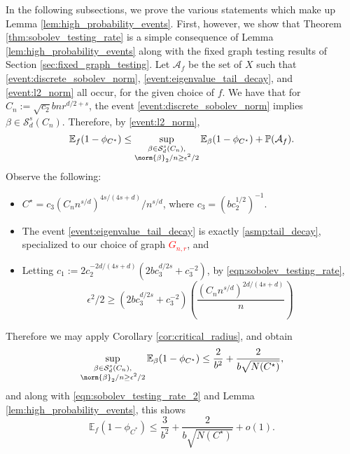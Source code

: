 \documentclass{article}
\newcommand{\1}{\mathbf{1}}
\newcommand{\Pbb}{\mathbb{P}}
\newcommand{\Ebb}{\mathbb{E}}
\theoremstyle{alden}
\theoremstyle{aldenthm}
\theoremstyle{definition}
\theoremstyle{remark}
\begin{document}
In the following subsections, we prove the various statements which make up Lemma \ref{lem:high_probability_events}. First, however, we show that Theorem \ref{thm:sobolev_testing_rate} is a simple consequence of Lemma \ref{lem:high_probability_events} along with the fixed graph testing results of Section \ref{sec:fixed_graph_testing}. Let $\mathcal{A}_f$ be the set of $X$ such that \ref{event:discrete_sobolev_norm}, \ref{event:eigenvalue_tail_decay}, and \ref{event:l2_norm} all occur, for the given choice of $f$. We have that for $C_n := \sqrt{c_2}bnr^{d/2 + s}$, the event \ref{event:discrete_sobolev_norm} implies $\beta \in \mathcal{S}_d^s(C_n)$. Therefore, by \ref{event:l2_norm},
\begin{equation}
\label{eqn:sobolev_testing_rate_2}
\Ebb_f(1 - \phi_{C^*}) \leq \sup_{\substack{\beta \in \mathcal{S}_d^{s}(C_n), \\ \norm{\beta}_2/n \geq \epsilon^2/2}} \Ebb_{\beta}(1 - \phi_{C^{\star}}) + \Pbb(\mathcal{A}_f).
\end{equation}
Observe the following: 
\begin{itemize}
	\item $C^{\star} = c_3(C_n n^{s/d})^{4s/(4s+d)}/n^{s/d}$, where $c_3 = (b c_2^{1/2})^{-1}$. 
	\item The event \ref{event:eigenvalue_tail_decay} is exactly \ref{asmp:tail_decay}, specialized to our choice of graph \textcolor{red}{$G_{n,r}$}, and 
	\item Letting $c_1 := 2c_2^{-2d/(4s + d)}\left(2bc_3^{d/2s} + c_3^{-2}\right)$, by \eqref{eqn:sobolev_testing_rate},
	\begin{equation*}
	\epsilon^2/2 \geq (2bc_3^{d/2s} + c_3^{-2}) \left(\frac{(C_n n^{s/d})^{2d/(4s + d)}}{n}\right)
	\end{equation*}
\end{itemize}
Therefore we may apply Corollary \ref{cor:critical_radius}, and obtain
\begin{equation*}
\sup_{\substack{\beta \in \mathcal{S}_d^{s}(C_n), \\ \norm{\beta}_2/n \geq \epsilon^2/2}} \Ebb_{\beta}(1 - \phi_{C^{\star}}) \leq \frac{2}{b^2} + \frac{2}{b\sqrt{N(C^{\star})}},
\end{equation*}
and along with \eqref{eqn:sobolev_testing_rate_2} and Lemma \ref{lem:high_probability_events}, this shows
\begin{equation*}
\Ebb_f(1 - \phi_{C^*}) \leq \frac{3}{b^2} + \frac{2}{b\sqrt{N(C^{\star})}} + o(1).
\end{equation*}
\end{document}
